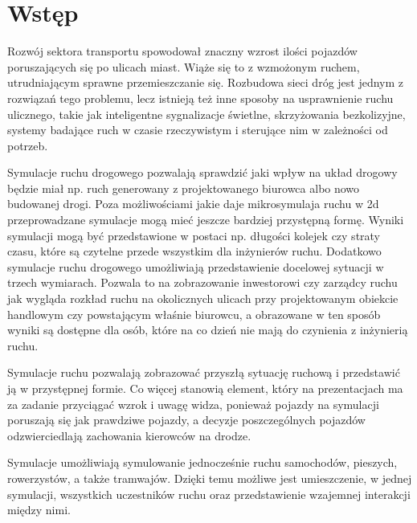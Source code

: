\documentclass{sprawozdanie-agh}
\begin{document}

	\stronatytulowa{}

	\tableofcontents
	\newpage

		\section{Wstęp}

		Rozwój sektora transportu spowodował znaczny wzrost ilości pojazdów poruszających się po ulicach miast. Wiąże się to z wzmożonym ruchem, utrudniającym sprawne przemieszczanie się. Rozbudowa sieci dróg jest jednym z rozwiązań tego problemu, lecz istnieją też inne sposoby na usprawnienie ruchu ulicznego, takie jak inteligentne sygnalizacje świetlne, skrzyżowania bezkolizyjne, systemy badające ruch w czasie rzeczywistym i sterujące nim w zależności od potrzeb.

		Symulacje ruchu drogowego pozwalają sprawdzić jaki wpływ na układ drogowy będzie miał np. ruch generowany z projektowanego biurowca albo nowo budowanej drogi. Poza możliwościami jakie daje mikrosymulaja ruchu w 2d przeprowadzane symulacje mogą mieć  jeszcze bardziej przystępną formę. Wyniki symulacji mogą być przedstawione w postaci np. długości kolejek czy straty czasu, które są czytelne przede wszystkim dla inżynierów ruchu. Dodatkowo symulacje ruchu drogowego umożliwiają przedstawienie docelowej sytuacji w trzech wymiarach. Pozwala to na zobrazowanie inwestorowi czy zarządcy ruchu jak wygląda rozkład ruchu na okolicznych ulicach przy projektowanym obiekcie handlowym czy powstającym właśnie biurowcu, a obrazowane w ten sposób wyniki są dostępne dla osób, które na co dzień nie mają do czynienia z inżynierią ruchu.

		Symulacje ruchu pozwalają zobrazować przyszłą sytuację ruchową i przedstawić ją w przystępnej formie. Co więcej stanowią element, który na prezentacjach ma za zadanie przyciągać wzrok i uwagę widza, ponieważ pojazdy na symulacji poruszają się jak prawdziwe pojazdy, a decyzje poszczególnych pojazdów odzwierciedlają zachowania kierowców na drodze.

		Symulacje umożliwiają symulowanie jednocześnie ruchu samochodów, pieszych, rowerzystów, a także tramwajów. Dzięki temu możliwe jest umieszczenie, w jednej symulacji, wszystkich uczestników ruchu oraz przedstawienie wzajemnej interakcji między nimi.
\end{document}
